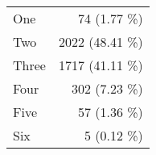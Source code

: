 \begin{tabular}{ l  r }
One & 74 (1.77 \%)\\
Two & 2022 (48.41 \%)\\
Three & 1717 (41.11 \%)\\
Four & 302 (7.23 \%)\\
Five & 57 (1.36 \%)\\
Six & 5 (0.12 \%)\\
\end{tabular}